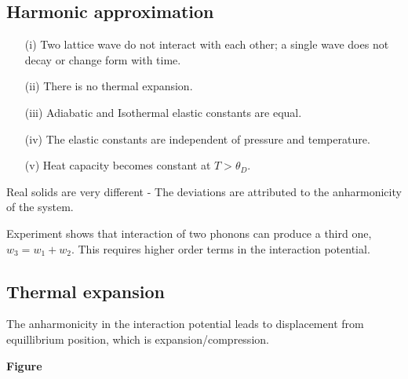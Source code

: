 \subsection*{Harmonic approximation}
\begin{itemize}
\item[(i)] Two lattice wave do not interact with each other; a single wave does not decay or change form with time.

\item[(ii)] There is no thermal expansion.

\item[(iii)] Adiabatic and Isothermal elastic constants are equal.

\item[(iv)] The elastic constants are independent of pressure and temperature.

\item[(v)] Heat capacity becomes constant at $T>\theta_{D}$.
\end{itemize}
Real solids are very different - The deviations are attributed to the anharmonicity of the system.

Experiment shows that interaction of two phonons can produce a third one, $w_{3}=w_{1}+w_{2}$. This requires higher order terms in the interaction potential.

\subsection*{Thermal expansion}

The anharmonicity in the interaction potential leads to displacement from equillibrium position, which is expansion/compression.
\begin{center}
{\bf Figure}
\end{center}

